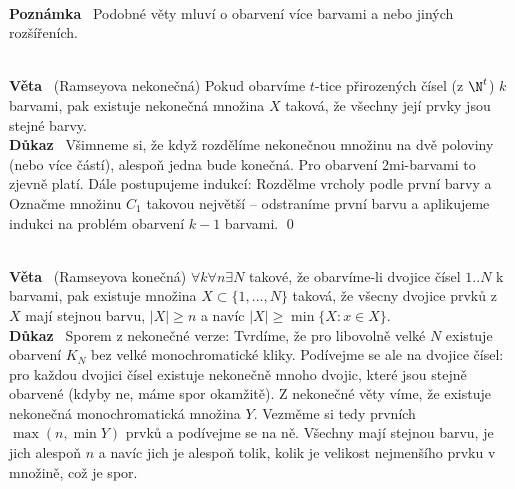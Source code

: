 \documentclass{article}
\renewcommand{\paragraph}[1]{\ \\\smallskip\noindent\textbf{#1}\ }
\begin{document}
\paragraph{Poznámka} Podobné věty mluví o obarvení více barvami a nebo jiných 
rozšířeních.

\paragraph{Věta} (Ramseyova nekonečná)
Pokud obarvíme $t$-tice přirozených čísel (z $\N^t$) $k$ barvami, pak existuje 
nekonečná množina $X$ taková, že všechny její prvky jsou stejné barvy.
\paragraph{Důkaz} Všimneme si, že když rozdělíme nekonečnou množinu na dvě 
poloviny (nebo více částí), alespoň jedna bude konečná. Pro obarvení 2mi-barvami 
to zjevně platí. Dále postupujeme indukcí: Rozdělme vrcholy podle první barvy a 
Označme množinu $C_1$ takovou největší -- odstraníme první barvu a aplikujeme 
indukci na problém obarvení $k-1$ barvami. \qed

\paragraph{Věta} (Ramseyova konečná) $\forall k \forall n \exists N$ takové, že 
obarvíme-li dvojice čísel $1..N$ k barvami, pak existuje množina $X\subset 
\{1,...,N\}$ taková, že všecny dvojice prvků z $X$ mají stejnou barvu, $|X| \geq 
n$ a navíc $|X| \geq \min\{X: x\in X\}$.
\paragraph{Důkaz} Sporem z nekonečné verze: Tvrdíme, že pro libovolně velké $N$ 
existuje obarvení $K_N$ bez velké monochromatické kliky. Podívejme se ale na 
dvojice čísel: pro každou dvojici čísel existuje nekonečně mnoho dvojic, které 
jsou stejně obarvené (kdyby ne, máme spor okamžitě). Z nekonečné věty víme, že 
existuje nekonečná monochromatická množina $Y$. Vezměme si tedy prvních $\max(n, 
\min Y)$ prvků a podívejme se na ně. Všechny mají stejnou barvu, je jich alespoň 
$n$ a navíc jich je alespoň tolik, kolik je velikost nejmenšího prvku v množině, 
což je spor.
\end{document}
